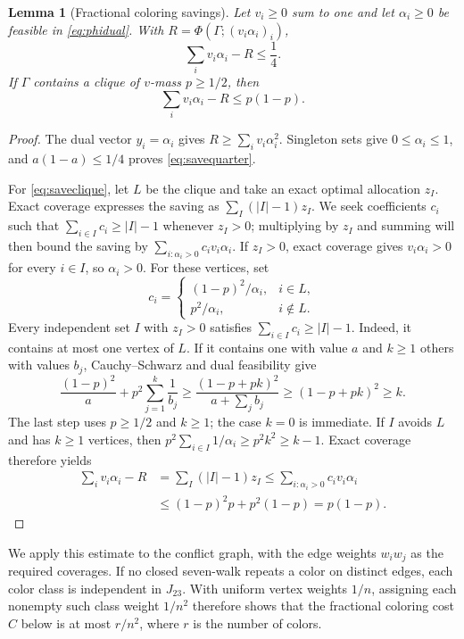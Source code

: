 \documentclass[10pt]{article}
\newtheorem{lem}[thm]{Lemma}
\theoremstyle{remark}
\begin{document}
\begin{lem}[Fractional coloring savings]\label{lem:palette}
Let $v_i\ge0$ sum to one and let $\alpha_i\ge0$ be feasible in \eqref{eq:phidual}. With $R=\Phi(\Gamma;(v_i\alpha_i)_i)$,
\begin{equation}\label{eq:savequarter}
 \sum_i v_i\alpha_i-R\le\frac14.
\end{equation}
If $\Gamma$ contains a clique of $v$-mass $p\ge1/2$, then
\begin{equation}\label{eq:saveclique}
 \sum_i v_i\alpha_i-R\le p(1-p).
\end{equation}
\end{lem}
\begin{proof}
The dual vector $y_i=\alpha_i$ gives $R\ge\sum_i v_i\alpha_i^2$. Singleton sets give $0\le\alpha_i\le1$, and $a(1-a)\le1/4$ proves \eqref{eq:savequarter}.

For \eqref{eq:saveclique}, let $L$ be the clique and take an exact optimal allocation $z_I$. Exact coverage expresses the saving as $\sum_I(|I|-1)z_I$. We seek coefficients $c_i$ such that $\sum_{i\in I}c_i\ge |I|-1$ whenever $z_I>0$; multiplying by $z_I$ and summing will then bound the saving by $\sum_{i:\alpha_i>0}c_iv_i\alpha_i$. If $z_I>0$, exact coverage gives $v_i\alpha_i>0$ for every $i\in I$, so $\alpha_i>0$. For these vertices, set
\[
 c_i=\begin{cases}(1-p)^2/\alpha_i,&i\in L,\\
                   p^2/\alpha_i,&i\notin L.
       \end{cases}
\]
Every independent set $I$ with $z_I>0$ satisfies $\sum_{i\in I}c_i\ge |I|-1$. Indeed, it contains at most one vertex of $L$. If it contains one with value $a$ and $k\ge1$ others with values $b_j$, Cauchy--Schwarz and dual feasibility give
\[
 \frac{(1-p)^2}{a}+p^2\sum_{j=1}^k\frac1{b_j}
 \ge\frac{(1-p+pk)^2}{a+\sum_jb_j}
 \ge(1-p+pk)^2\ge k.
\]
The last step uses $p\ge1/2$ and $k\ge1$; the case $k=0$ is immediate. If $I$ avoids $L$ and has $k\ge1$ vertices, then $p^2\sum_{i\in I}1/\alpha_i\ge p^2k^2\ge k-1$. Exact coverage therefore yields
\[
 \begin{aligned}
 \sum_i v_i\alpha_i-R
 &=\sum_I(|I|-1)z_I
 \le\sum_{i:\alpha_i>0} c_iv_i\alpha_i\\
 &\le (1-p)^2p+p^2(1-p)=p(1-p).
 \end{aligned}
\]
\end{proof}

We apply this estimate to the conflict graph, with the edge weights $w_iw_j$ as the required coverages. If no closed seven-walk repeats a color on distinct edges, each color class is independent in $J_{23}$. With uniform vertex weights $1/n$, assigning each nonempty such class weight $1/n^2$ therefore shows that the fractional coloring cost $C$ below is at most $r/n^2$, where $r$ is the number of colors.
\end{document}
